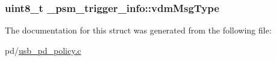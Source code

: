 \hypertarget{struct__psm__trigger__info_a3a905de589c3b9f39958a1597865286b}{
\subsubsection[{vdm\-Msg\-Type}]{\setlength{\rightskip}{0pt plus 5cm}uint8\-\_\-t \-\_\-psm\-\_\-trigger\-\_\-info\-::vdm\-Msg\-Type}}\label{struct__psm__trigger__info_a3a905de589c3b9f39958a1597865286b}


The documentation for this struct was generated from the following file\-:\begin{DoxyCompactItemize}
\item 
pd/\hyperlink{usb__pd__policy_8c}{usb\-\_\-pd\-\_\-policy.\-c}\end{DoxyCompactItemize}
